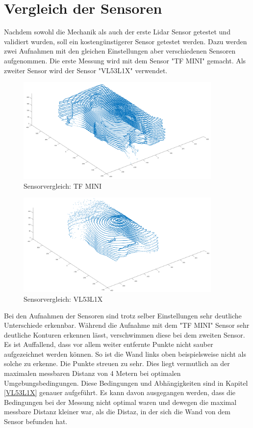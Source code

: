 \section{Vergleich der Sensoren}

Nachdem sowohl die Mechanik als auch der erste Lidar Sensor getestet und validiert wurden, soll ein kostengünstigerer Sensor getestet werden. Dazu werden zwei Aufnahmen mit den gleichen Einstellungen aber verschiedenen Sensoren aufgenommen. Die erste Messung wird mit dem Sensor "TF MINI" gemacht. Als zweiter Sensor wird der Sensor "VL53L1X" verwendet.

 

\begin{figure}[H]
	\centering
	\includegraphics[width=0.9\textwidth]{images/Validierung/Aufloesungen/mittel.png}
	\caption{Sensorvergleich: TF MINI}
	\label{hoch}
\end{figure}



\begin{figure}[H]
	\centering
	\includegraphics[width=0.9\textwidth]{images/Validierung/VL53.png}
	\caption{Sensorvergleich: VL53L1X}
	\label{vlx}
\end{figure}

Bei den Aufnahmen der Sensoren sind trotz selber Einstellungen sehr deutliche Unterschiede erkennbar. Während die Aufnahme mit dem "TF MINI" Sensor sehr deutliche Konturen erkennen lässt, verschwimmen diese bei dem zweiten Sensor. Es ist Auffallend, dass vor allem weiter entfernte Punkte nicht sauber aufgezeichnet werden können. So ist die Wand links oben beispielsweise nicht als solche zu erkenne. Die Punkte streuen zu sehr. Dies liegt vermutlich an der maximalen messbaren Distanz von 4 Metern bei optimalen Umgebungsbedingungen. Diese Bedingungen und Abhängigkeiten sind in Kapitel \ref{VL53L1X} genauer aufgeführt. Es kann davon ausgegangen werden, dass die Bedingungen bei der Messung nicht optimal waren und dewegen die maximal messbare Distanz kleiner war, als die Distaz, in der sich die Wand von dem Sensor befunden hat. 

